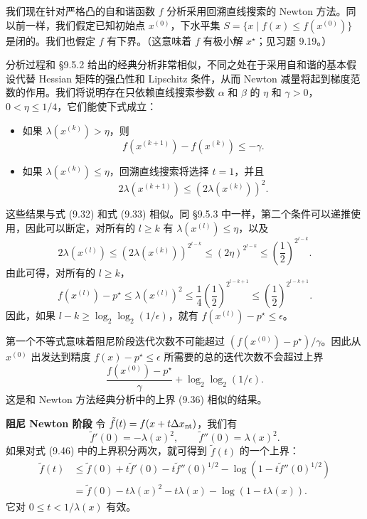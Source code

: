 \documentclass[UTF8, 12pt, fontset=fandol, oneside]{ctexart}
\begin{document}
我们现在针对严格凸的自和谐函数 $f$ 分析采用回溯直线搜索的 Newton 方法。同以前一样，我们假定已知初始点 $x^{(0)}$，下水平集 $S=\{x\mid f(x)\leq f(x^{(0)})\}$ 是闭的。我们也假定 $f$ 有下界。（这意味着 $f$ 有极小解 $x^\star$；见习题 9.19。）

分析过程和 \S9.5.2 给出的经典分析非常相似，不同之处在于采用自和谐的基本假设代替 Hessian 矩阵的强凸性和 Lipschitz 条件，从而 Newton 减量将起到梯度范数的作用。我们将说明存在只依赖直线搜索参数 $\alpha$ 和 $\beta$ 的 $\eta$ 和 $\gamma>0$，$0<\eta\leq1/4$，它们能使下式成立：
\begin{itemize}
\item 如果 $\lambda(x^{(k)})>\eta$，则
\begin{equation}
f(x^{(k+1)})-f(x^{(k)})\leq-\gamma.
\tag{9.51}
\end{equation}
\item 如果 $\lambda(x^{(k)})\leq\eta$，回溯直线搜索将选择 $t=1$，并且
\begin{equation}
2\lambda(x^{(k+1)})\leq \left(2\lambda(x^{(k)})\right)^2.
\tag{9.52}
\end{equation}
\end{itemize}
这些结果与式 (9.32) 和式 (9.33) 相似。同 \S9.5.3 中一样，第二个条件可以递推使用，因此可以断定，对所有的 $l\geq k$ 有 $\lambda(x^{(l)})\leq\eta$，以及
\[
2\lambda(x^{(l)})\leq \left(2\lambda(x^{(k)})\right)^{2^{l-k}}
\leq (2\eta)^{2^{l-k}}\leq \left(\frac{1}{2}\right)^{2^{l-k}}.
\]
由此可得，对所有的 $l\geq k$，
\[
f(x^{(l)})-p^\star\leq \lambda(x^{(l)})^2
\leq \frac{1}{4}\left(\frac{1}{2}\right)^{2^{l-k+1}}
\leq \left(\frac{1}{2}\right)^{2^{l-k+1}}.
\]
因此，如果 $l-k\geq\log_2\log_2(1/\epsilon)$，就有 $f(x^{(l)})-p^\star\leq\epsilon$。

第一个不等式意味着阻尼阶段迭代次数不可能超过 $(f(x^{(0)})-p^\star)/\gamma$。因此从 $x^{(0)}$ 出发达到精度 $f(x)-p^\star\leq\epsilon$ 所需要的总的迭代次数不会超过上界
\begin{equation}
\frac{f(x^{(0)})-p^\star}{\gamma}+\log_2\log_2(1/\epsilon).
\tag{9.53}
\end{equation}
这是和 Newton 方法经典分析中的上界 (9.36) 相似的结果。

\noindent\textbf{阻尼 Newton 阶段}\quad
令 $\tilde{f}(t)=f(x+t\Delta x_{\rm nt})$，我们有
\[
\tilde{f}'(0)=-\lambda(x)^2,\qquad \tilde{f}''(0)=\lambda(x)^2.
\]
如果对式 (9.46) 中的上界积分两次，就可得到 $\tilde{f}(t)$ 的一个上界：
\begin{equation}
\begin{aligned}
\tilde{f}(t)
&\leq \tilde{f}(0)+t\tilde{f}'(0)-t\tilde{f}''(0)^{1/2}
-\log\left(1-t\tilde{f}''(0)^{1/2}\right)\\
&=\tilde{f}(0)-t\lambda(x)^2-t\lambda(x)-\log(1-t\lambda(x)).
\end{aligned}
\tag{9.54}
\end{equation}
它对 $0\leq t<1/\lambda(x)$ 有效。
\end{document}
